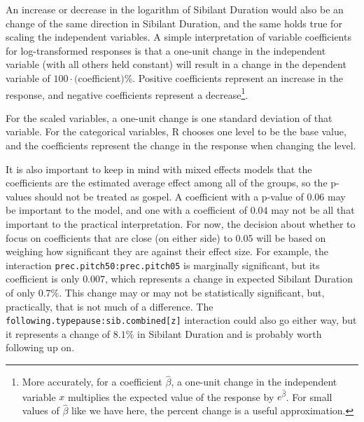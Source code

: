 \documentclass[a4paper]{article}
\begin{document}
An increase or decrease in the logarithm of Sibilant Duration would also be an
change of the same direction in Sibilant Duration, and the same holds true for scaling the
independent variables.  A simple interpretation of
variable coefficients for log-transformed responses is that  a
one-unit change in the independent variable (with all others held
constant) will result in a change in the dependent variable of
$100\cdot($coefficient$)$\%.  Positive coefficients represent an
increase in the response, and negative coefficients represent a decrease\footnote{
  More accurately, for a coefficient $\hat{\beta}$, a one-unit change in the
  independent variable $x$ multiplies the expected value of the response
  by $e^{\hat{\beta}}$.  For small values of $\hat{\beta}$ like we
  have here, the percent change is a useful approximation.
}.

For the scaled variables, a one-unit change is one standard deviation
of that variable.  For the categorical variables, R chooses one level
to be the base value, and the coefficients represent the change in the
response when changing the level.

It is also important to keep in mind with
mixed effects models that the coefficients are the estimated average
effect among all of the groups, so the p-values should not be treated
as gospel.  A coefficient with a p-value of $0.06$ may be important to
the model, and one with a coefficient of $0.04$ may not be all that important
to the practical interpretation.  For now, the decision about whether to focus on
coefficients that are close (on either side) to
$0.05$ will be based on weighing how significant they are against
their effect size.  For example, the interaction
\texttt{prec.pitch50:prec.pitch05} is marginally significant, but
its coefficient is only $0.007$, which represents a change in expected
Sibilant Duration of only $0.7$\%.  This change may or may not be
statistically significant, but, practically, that is not much of a
difference.  The \texttt{following.typepause:sib.combined[z]}
interaction could also go either way, but it represents a change of
$8.1$\% in Sibilant Duration and is probably worth following up on.
\end{document}
